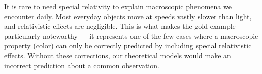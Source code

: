 \begin{commentary}
It is rare to need special relativity to explain macroscopic phenomena we encounter daily. Most everyday objects move at speeds vastly slower than light, and relativistic effects are negligible. This is what makes the gold example particularly noteworthy — it represents one of the few cases where a macroscopic property (color) can only be correctly predicted by including special relativistic effects. Without these corrections, our theoretical models would make an incorrect prediction about a common observation.
\end{commentary}

\thispagestyle{empty}
\begin{figure}[p]
\centering
{}
\end{figure}

